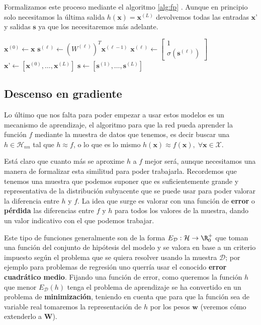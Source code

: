 Formalizamos este proceso mediante el algoritmo \autoref{alg:fp} \cite{abu2012learning}. Aunque en principio solo necesitamos la última salida $h(\textbf{x}) = \textbf{x}^{(L)}$ devolvemos todas las entradas $\textbf{x'}$ y salidas $\textbf{s}$ ya que los necesitaremos más adelante.

\begin{algorithm}[htbp]
\SetAlgoLined
 $\textbf{x}^{(0)} \gets \textbf{x}$\;
  {
  $\textbf{s}^{(\ell)} \gets (W^{(\ell)})^T \textbf{x}^{(\ell - 1)}$\;
  $\textbf{x}^{(\ell)} \gets \begin{bmatrix} 1 \\ \sigma(\textbf{s}^{(\ell)})\end{bmatrix}$\;
 }
 $\textbf{x'} \gets \left[\textbf{x}^{(0)}, \ldots, \textbf{x}^{(L)}\right]$\;
 $\textbf{s} \gets \left[\textbf{s}^{(1)}, \ldots, \textbf{s}^{(L)}\right]$\;
 \caption{$ForwardPropagation(\textbf{x})$)}
 \label{alg:fp}
\end{algorithm}

\subsection{Descenso en gradiente}

Lo último que nos falta para poder empezar a usar estos modelos es un mecanismo de aprendizaje, el algoritmo para que la red pueda aprender la función $f$ mediante la muestra de datos que tenemos, es decir buscar una $h \in \mathcal{H}_{nn}$ tal que $h \approx f$, o lo que es lo mismo $h(\textbf{x}) \approx f(\textbf{x}), \; \forall \textbf{x} \in \mathcal{X}$.

Está claro que cuanto más se aproxime $h$ a $f$ mejor será, aunque necesitamos una manera de formalizar esta similitud para poder trabajarla. Recordemos que tenemos una muestra que podemos suponer que es suficientemente grande y representativa de la distribución subyacente que se puede usar para poder valorar la diferencia entre $h$ y $f$. La idea que surge es valorar con una función de \textbf{error} o \textbf{pérdida} las diferencias entre $f$ y $h$ para todos los valores de la muestra, dando un valor indicativo con el que podemos trabajar.

Este tipo de funciones generalmente son de la forma $E_{\mathcal{D}} : \mathcal{H} \to \R^+_0$ que toman una función del conjunto de hipótesis del modelo y se valora en base a un criterio impuesto según el problema que se quiera resolver usando la muestra $\mathcal{D}$; por ejemplo para problemas de regresión uno querría usar el conocido \textbf{error cuadrático medio}. Fijando una función de error, como queremos la función $h$ que menor $E_{\mathcal{D}}(h)$ tenga el problema de aprendizaje se ha convertido en un problema de \textbf{minimización}, teniendo en cuenta que para que la función sea de variable real tomaremos la representación de $h$ por los pesos $\textbf{w}$ (veremos cómo extenderlo a $\textbf{W}$).

